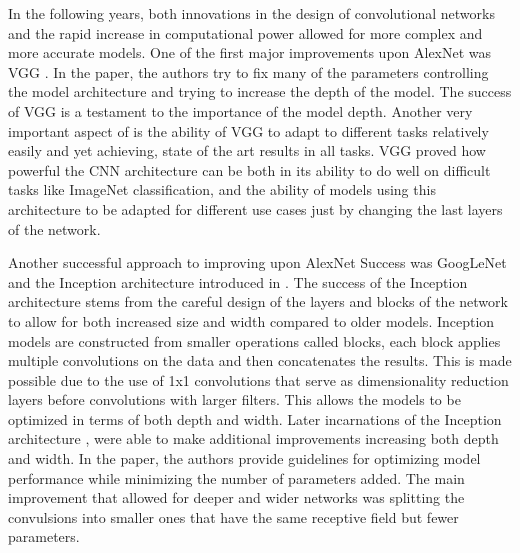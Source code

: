 \documentclass[../main.tex]{subfiles}
\begin{document}
In the following years, both innovations in the design of convolutional networks and the rapid increase in computational power allowed for more complex and more accurate models.
One of the first major improvements upon AlexNet was VGG \cite{vgg}. In the paper, the authors try to fix many of the parameters controlling the model architecture and trying to increase the depth of the model.
The success of VGG is a testament to the importance of the model depth.
Another very important aspect of \cite{vgg} is the ability of VGG to adapt to different tasks relatively easily and yet achieving, state of the art results in all tasks.
VGG proved how powerful the CNN architecture can be both in its ability to do well on difficult tasks like ImageNet classification,
and the ability of models using this architecture to be adapted for different use cases just by changing the last layers of the network.
\par

Another successful approach to improving upon AlexNet Success was GoogLeNet and the Inception architecture introduced in \cite{inception}.
The success of the Inception architecture stems from the careful design of the layers and blocks of the network to allow for both increased size and width compared to older models.
Inception models are constructed from smaller operations called blocks, each block applies multiple convolutions on the data and then concatenates the results.
This is made possible due to the use of 1x1 convolutions that serve as dimensionality reduction layers before convolutions with larger filters.
This allows the models to be optimized in terms of both depth and width.
Later incarnations of the Inception architecture \cite{inceptionv2-3}, were able to make additional improvements increasing both depth and width.
In the paper, the authors provide guidelines for optimizing model performance while minimizing the number of parameters added.
The main improvement that allowed for deeper and wider networks was splitting the convulsions into smaller ones that have the same receptive field but fewer parameters.
\par
\end{document}
